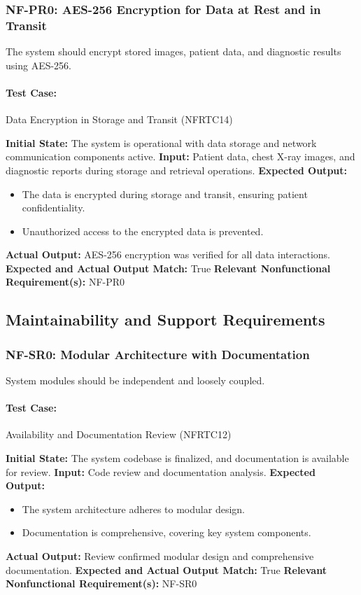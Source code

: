 \documentclass[12pt, titlepage]{article}
\begin{document}
\subsubsection{NF-PR0: AES-256 Encryption for Data at Rest and in Transit}
The system should encrypt stored images, patient data, and diagnostic results using AES-256.

\paragraph{Test Case:} Data Encryption in Storage and Transit (NFRTC14)

\textbf{Initial State:} The system is operational with data storage and network communication components active.  
\textbf{Input:} Patient data, chest X-ray images, and diagnostic reports during storage and retrieval operations.  
\textbf{Expected Output:}
\begin{itemize}
    \item The data is encrypted during storage and transit, ensuring patient confidentiality.
    \item Unauthorized access to the encrypted data is prevented.
\end{itemize}
\textbf{Actual Output:} AES-256 encryption was verified for all data interactions.  
\textbf{Expected and Actual Output Match:} True  
\textbf{Relevant Nonfunctional Requirement(s):} NF-PR0  

\subsection{Maintainability and Support Requirements}

\subsubsection{NF-SR0: Modular Architecture with Documentation}
System modules should be independent and loosely coupled.

\paragraph{Test Case:} Availability and Documentation Review (NFRTC12)

\textbf{Initial State:} The system codebase is finalized, and documentation is available for review.  
\textbf{Input:} Code review and documentation analysis.  
\textbf{Expected Output:}
\begin{itemize}
    \item The system architecture adheres to modular design.
    \item Documentation is comprehensive, covering key system components.
\end{itemize}
\textbf{Actual Output:} Review confirmed modular design and comprehensive documentation.  
\textbf{Expected and Actual Output Match:} True  
\textbf{Relevant Nonfunctional Requirement(s):} NF-SR0  
\end{document}
